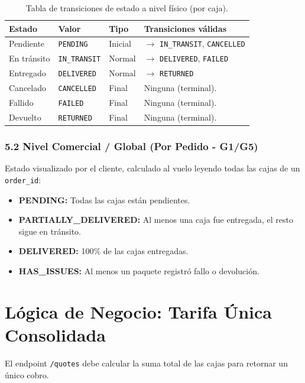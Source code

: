 \documentclass[11pt, a4paper]{article}
\begin{document}
\begin{table}[ht!]
\centering
\renewcommand{\arraystretch}{1.4}
\begin{tabularx}{\textwidth}{l l l X}
  \toprule
  \textbf{Estado} & \textbf{Valor} & \textbf{Tipo} & \textbf{Transiciones válidas} \\
  \midrule
  Pendiente   & \texttt{PENDING}     & Inicial & $\rightarrow$ \texttt{IN\_TRANSIT}, \texttt{CANCELLED} \\
  En tránsito & \texttt{IN\_TRANSIT} & Normal  & $\rightarrow$ \texttt{DELIVERED}, \texttt{FAILED} \\
  Entregado   & \texttt{DELIVERED}   & Normal  & $\rightarrow$ \texttt{RETURNED} \\
  Cancelado   & \texttt{CANCELLED}   & Final   & Ninguna (terminal). \\
  Fallido     & \texttt{FAILED}      & Final   & Ninguna (terminal). \\
  Devuelto    & \texttt{RETURNED}    & Final   & Ninguna (terminal). \\
  \bottomrule
\end{tabularx}
\caption{Tabla de transiciones de estado a nivel físico (por caja).}
\end{table}

\subsubsection{5.2 Nivel Comercial / Global (Por Pedido - G1/G5)}
Estado visualizado por el cliente, calculado al vuelo leyendo todas las cajas de un \texttt{order\_id}:
\begin{itemize}[noitemsep]
  \item \textbf{PENDING:} Todas las cajas están pendientes.
  \item \textbf{PARTIALLY\_DELIVERED:} Al menos una caja fue entregada, el resto sigue en tránsito.
  \item \textbf{DELIVERED:} 100\% de las cajas entregadas.
  \item \textbf{HAS\_ISSUES:} Al menos un paquete registró fallo o devolución.
\end{itemize}




\section{Lógica de Negocio: Tarifa Única Consolidada}

El endpoint \texttt{/quotes} debe calcular la suma total de las cajas para retornar un único cobro.
\end{document}
